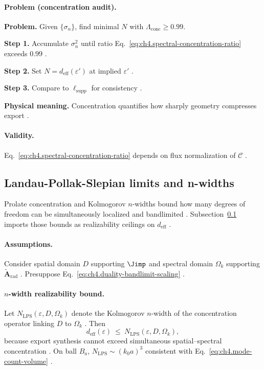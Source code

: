 \paragraph{Problem (concentration audit).}
\textbf{Problem.} Given \(\{\sigma_{n}\}\), find minimal \(N\) with \(\Lambda_{\mathrm{conc}}\ge0.99\).

\textbf{Step 1.} Accumulate \(\sigma_{n}^{2}\) until ratio Eq.~\eqref{eq:ch4.spectral-concentration-ratio} exceeds \(0.99\) \cite{harrington2001}.

\textbf{Step 2.} Set \(N=d_{\mathrm{eff}}(\varepsilon')\) at implied \(\varepsilon'\) \cite{hansen1988,devaney2004}.

\textbf{Step 3.} Compare to \(\ell_{\mathrm{supp}}\) for consistency \cite{stratton1941}.

\textbf{Physical meaning.} Concentration quantifies how sharply geometry compresses export \cite{hansen1988}.

\paragraph{Validity.}
Eq.~\eqref{eq:ch4.spectral-concentration-ratio} depends on flux normalization of \(\mathcal{C}\) \cite{hansen1988,stratton1941}.


\subsection{Landau-Pollak-Slepian limits and n-widths}
\label{sec:ch484}

Prolate concentration and Kolmogorov \(n\)-widths bound how many degrees of freedom can be simultaneously localized and bandlimited
\cite{hansen1988,stratton1941}. Subsection~\ref{sec:ch484} imports those bounds as realizability ceilings on \(d_{\mathrm{eff}}\)
\cite{harrington2001,devaney2004}.

\paragraph{Assumptions.}
Consider spatial domain \(D\) supporting \(\Jimp\) and spectral domain \(\Omega_{k}\) supporting \(\widetilde{\mathbf{A}}_{\mathrm{rad}}\)
\cite{stratton1941,jackson1999}. Presuppose Eq.~\eqref{eq:ch4.duality-bandlimit-scaling} \cite{hansen1988}.

\paragraph{\(n\)-width realizability bound.}
Let \(N_{\mathrm{LPS}}(\varepsilon,D,\Omega_{k})\) denote the Kolmogorov \(n\)-width of the concentration operator linking \(D\) to
\(\Omega_{k}\) \cite{hansen1988,stratton1941}. Then
\begin{equation}
\label{eq:ch4.lps-nwidth-bound}
d_{\mathrm{eff}}(\varepsilon)
\ \le\
N_{\mathrm{LPS}}(\varepsilon,D,\Omega_{k}),
\end{equation}
because export synthesis cannot exceed simultaneous spatial--spectral concentration \cite{harrington2001,devaney2004}. On ball
\(B_{a}\), \(N_{\mathrm{LPS}}\sim(k_{0}a)^{3}\) consistent with Eq.~\eqref{eq:ch4.mode-count-volume} \cite{jackson1999,hansen1988}.

